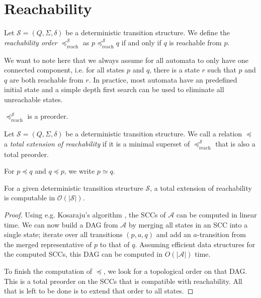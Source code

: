 \vspace{5pt}





\section{Reachability}

\begin{defn}
	Let $\mathcal{S} = (Q, \Sigma, \delta)$ be a deterministic transition structure. We define the \emph{reachability order} $\preceq_\text{reach}^\mathcal{S}$ as $p \preceq_\text{reach}^\mathcal{S} q$ if and only if $q$ is reachable from $p$. 
\end{defn}

We want to note here that we always assume for all automata to only have one connected component, i.e. for all states $p$ and $q$, there is a state $r$ such that $p$ and $q$ are both reachable from $r$. In practice, most automata have an predefined initial state and a simple depth first search can be used to eliminate all unreachable states.

\begin{lem}
	$\preceq_\text{reach}^\mathcal{S}$ is a preorder.
\end{lem}

\begin{defn}
	Let $\mathcal{S} = (Q, \Sigma, \delta)$ be a deterministic transition structure. We call a relation $\preceq$ a \emph{total extension of reachability} if it is a minimal superset of $\preceq_\text{reach}^\mathcal{S}$ that is also a total preorder.
	
	For $p \preceq q$ and $q \preceq p$, we write $p \simeq q$.
\end{defn}

\begin{lem}
	For a given deterministic transition structure $\mathcal{S}$, a total extension of reachability is computable in $\mathcal{O}(|\mathcal{S}|)$.
	\label{lem:general:reach_topo_lintime}
\end{lem}

\begin{proof}
	Using e.g. Kosaraju's algorithm \cite{Sharir81}, the SCCs of $\mathcal{A}$ can be computed in linear time. We can now build a DAG from $\mathcal{A}$ by merging all states in an SCC into a single state; iterate over all transitions $(p, a, q)$ and add an $a$-transition from the merged representative of $p$ to that of $q$. Assuming efficient data structures for the computed SCCs, this DAG can be computed in $O(|\mathcal{A}|)$ time.
	
	To finish the computation of $\preceq$, we look for a topological order on that DAG. This is a total preorder on the SCCs that is compatible with reachability. All that is left to be done is to extend that order to all states.
\end{proof}




